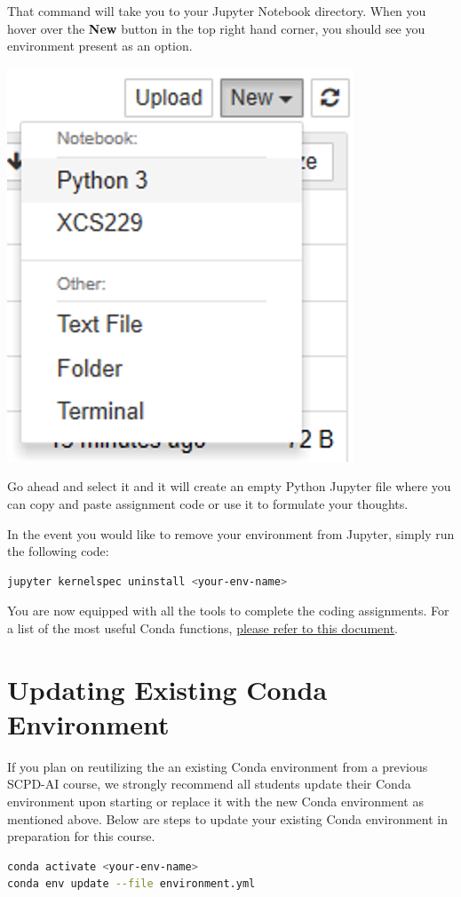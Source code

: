 \documentclass{article}
\begin{document}
That command will take you to your Jupyter Notebook directory. When you hover over the \textbf{New} button in the top right hand corner, you should see you environment present as an option.
\begin{center}
   \includegraphics[]{p2.png} 
\end{center}
Go ahead and select it and it will create an empty Python Jupyter file where you can copy and paste assignment code or use it to formulate your thoughts. 

In the event you would like to remove your environment from Jupyter, simply run the following code:
\begin{lstlisting}[language=bash]
jupyter kernelspec uninstall <your-env-name>
\end{lstlisting}

You are now equipped with all the tools to complete the coding assignments. For a list of the most useful Conda functions, \href{https://docs.conda.io/projects/conda/en/latest/_downloads/843d9e0198f2a193a3484886fa28163c/conda-cheatsheet.pdf}{please refer to this document}. 

\section{Updating Existing Conda Environment}
 If you plan on reutilizing the an existing Conda environment from a previous SCPD-AI course, we strongly recommend all students update their Conda environment upon starting or replace it with the new Conda environment as mentioned above. Below are steps to update your existing Conda environment in preparation for this course. 

\begin{lstlisting}[language=bash]
conda activate <your-env-name>
conda env update --file environment.yml 
\end{lstlisting}
 
\end{document}
